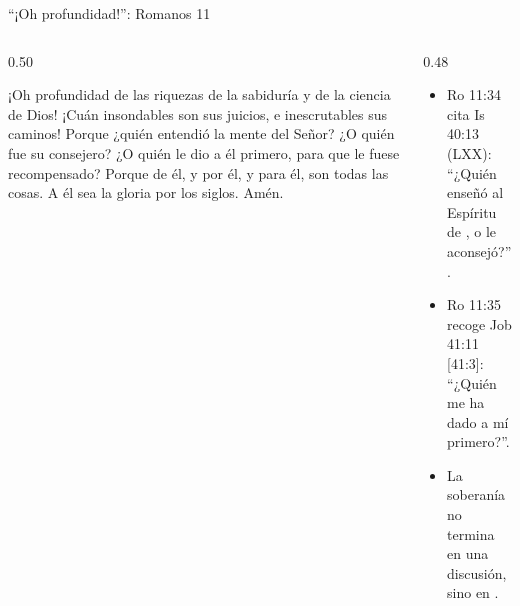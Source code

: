 \begin{frame}{``¡Oh profundidad!'': Romanos 11}
\begin{columns}[t,onlytextwidth]
\begin{column}{0.50\textwidth}
\begin{cita}¡Oh profundidad de las riquezas de la sabiduría y de la ciencia de Dios! ¡Cuán insondables son sus juicios, e inescrutables sus caminos! Porque ¿quién entendió la mente del Señor? ¿O quién fue su consejero? ¿O quién le dio a él primero, para que le fuese recompensado? Porque de él, y por él, y para él, son todas las cosas. A él sea la gloria por los siglos. Amén.\end{cita}
\end{column}
\begin{column}{0.48\textwidth}\small
\begin{itemize}
\item Ro 11:34 cita Is 40:13 (LXX): ``¿Quién enseñó al Espíritu de \SENOR, o le aconsejó?''.
\item Ro 11:35 recoge Job 41:11 [41:3]: ``¿Quién me ha dado a mí primero?''.
\item La soberanía no termina en una discusión, sino en .
\end{itemize}
\centering
{}
\end{column}
\end{columns}
\end{frame}

